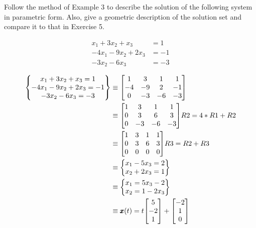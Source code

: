 \documentclass{../mathhomework}
\newenvironment{Mat}{\begin{bmatrix}}{\end{bmatrix}}
\begin{document}
\pagebreak
\begin{problem}[1.5\#15]
    Follow the method of Example 3 to describe the solution  of the following system in parametric form. 
    Also, give a geometric description of the solution set and compare it to that in Exercise 5.

    \begin{align*}
        x_1 + 3x_2 + x_3 & = 1 \\
        -4x_1 - 9x_2 + 2x_3 & = -1 \\
        -3x_2 - 6x_3 &= -3
    \end{align*}

    \begin{solution}
        \begin{align*}
            \begin{Bmatrix}
                x_1 + 3x_2 + x_3  = 1 \\
                -4x_1 - 9x_2 + 2x_3  = -1 \\
                -3x_2 - 6x_3 = -3
            \end{Bmatrix} & \equiv
            \begin{Mat}
                1 & 3 & 1 & 1 \\
                -4 & -9 & 2 & -1 \\
                0 & -3 & -6 & -3
            \end{Mat} \\ & \equiv
            \begin{Mat}
                1 & 3 & 1 & 1 \\
                0 & 3 & 6 & 3 \\
                0 & -3 & -6 & -3
            \end{Mat} R2 = 4*R1 + R2 \\ & \equiv
            \begin{Mat}
                1 & 3 & 1 & 1 \\
                0 & 3 & 6 & 3 \\
                0 & 0 & 0 & 0
            \end{Mat} R3 = R2 + R3 \\ & \equiv
            \begin{Bmatrix}
                x_1 - 5x_3 = 2 \\
                x_2 + 2x_3 = 1
            \end{Bmatrix} \\ & \equiv
            \begin{Bmatrix}
                x_1 = 5x_3 -2 \\
                x_2 = 1 - 2x_3
            \end{Bmatrix} \\ & \equiv
            \Vect{x}(t) = t\begin{Mat}5\\-2\\1\end{Mat} + \begin{Mat}-2\\1\\0\end{Mat}
        \end{align*}


\end{solution}
\end{problem}
\end{document}
